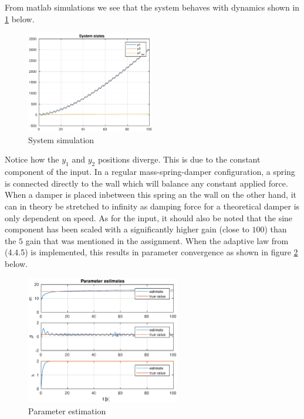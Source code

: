 \documentclass[]{article}
\begin{document}
\subsection{}
From matlab simulations we see that the system behaves with dynamics shown in \ref{fig:sys} below.
\begin{figure}[H]
\centering
\includegraphics[width=0.5\textwidth]{sys}
\caption{System simulation}
\label{fig:sys}
\end{figure}
Notice how the $y_1$ and $y_2$ positions diverge. This is due to the constant component of the input. In a regular mass-spring-damper configuration, a spring is connected directly to the wall which will balance any constant applied force. When a damper is placed inbetween this spring an the wall on the other hand, it can in theory be stretched to infinity as damping force for a theoretical damper is only dependent on speed. As for the input, it should also be noted that the sine component has been scaled with a significantly higher gain (close to $100$) than the $5$ gain that was mentioned in the assignment. When the adaptive law from (4.4.5) is implemented, this results in parameter convergence as shown in figure \ref{fig:params} below.
\begin{figure}[H]
\centering
\includegraphics[width=0.6\textwidth]{params}
\caption{Parameter estimation}
\label{fig:params}
\end{figure}
\end{document}
